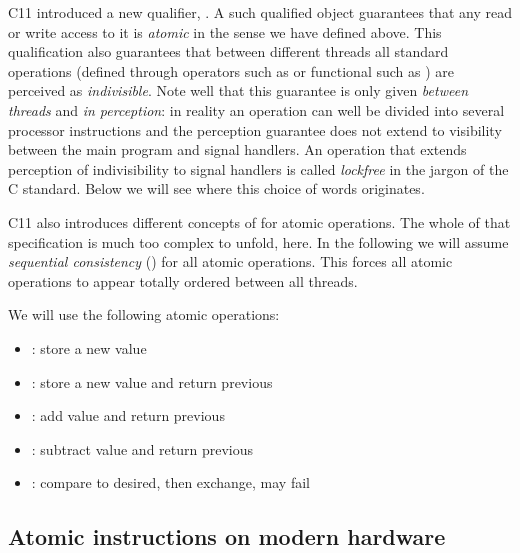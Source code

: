 C11 introduced a new qualifier, . A such qualified object
guarantees that any read or write access to it is \emph{atomic} in the
sense we have defined above. This qualification also guarantees
that between different threads all standard operations (defined
through operators such as \code{+=} or functional such as
) are perceived as \emph{indivisible}. Note well that
this guarantee is only given \emph{between threads} and \emph{in perception}:
in reality an operation can well be divided into several processor
instructions and the perception guarantee does not extend to
visibility between the main program and signal handlers. An
operation that extends perception of indivisibility to signal
handlers is called \emph{lockfree} in the jargon of the C
standard. Below we will see where this choice of words originates.

C11 also introduces different concepts of  for atomic
operations. The whole of that specification is much too complex to
unfold, here. In the following we will assume \emph{sequential
consistency} () for all atomic
operations. This forces all atomic operations to appear totally
ordered between all threads.

We will use the following atomic operations:
\itemadjust
\begin{itemize}
\item[] \hspace*{-3ex}: store a new value
\itemadjust
\item[] \hspace*{-3ex}: store a new value and
 return previous
\itemadjust
\item[] \hspace*{-3ex}: add value and
 return previous
\itemadjust
\item[] \hspace*{-3ex}: subtract value and
 return previous
\itemadjust
\item[] \hspace*{-3ex}: compare to desired, then
  exchange, may fail
\end{itemize}
\fi

\subsection{Atomic instructions on modern hardware}
\label{sec-2-2}

